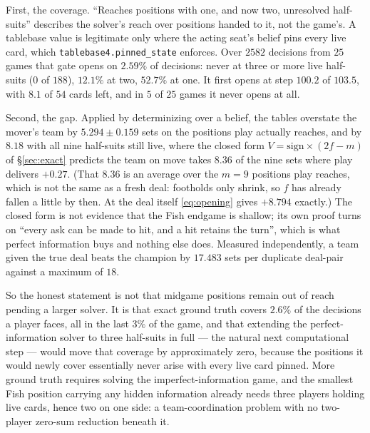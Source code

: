 \documentclass[11pt,a4paper]{article}
\begin{document}
First, the coverage. ``Reaches positions with one, and now two, unresolved
half-suits'' describes the solver's reach over positions handed to it, not the
game's. A tablebase value is legitimate only where the acting seat's belief pins
every live card, which \texttt{tablebase4.pinned\_state} enforces. Over $2582$
decisions from $25$ games that gate opens on $2.59\%$ of decisions: never at
three or more live half-suits ($0$ of $188$), $12.1\%$ at two, $52.7\%$ at one.
It first opens at step $100.2$ of $103.5$, with $8.1$ of $54$ cards left, and in
$5$ of $25$ games it never opens at all.

Second, the gap. Applied by determinizing over a belief, the tables overstate
the mover's team by $5.294 \pm 0.159$ sets on the positions play actually
reaches, and by $8.18$ with all nine half-suits still live, where the closed form
$V = \mathrm{sign} \times (2f - m)$ of \S\ref{sec:exact} predicts the team on
move takes $8.36$ of the nine sets where play delivers $+0.27$. (That $8.36$ is
an average over the $m = 9$ positions play reaches, which is not the same as a
fresh deal: footholds only shrink, so $f$ has already fallen a little by then.
At the deal itself \eqref{eq:opening} gives $+8.794$ exactly.) The closed form
is not evidence that the Fish endgame is shallow; its own proof turns on ``every
ask can be made to hit, and a hit retains the turn'', which is what perfect
information buys and nothing else does. Measured independently, a team given
the true deal beats the champion by $17.483$ sets per duplicate deal-pair
against a maximum of $18$.

So the honest statement is not that midgame positions remain out of reach
pending a larger solver. It is that exact ground truth covers $2.6\%$ of the
decisions a player faces, all in the last $3\%$ of the game, and that extending
the perfect-information solver to three half-suits in full --- the natural next
computational step --- would move that coverage by approximately zero, because
the positions it would newly cover essentially never arise with every live card
pinned. More ground truth requires solving the imperfect-information game, and
the smallest Fish position carrying any hidden information already needs three
players holding live cards, hence two on one side: a team-coordination problem
with no two-player zero-sum reduction beneath it.
\end{document}
